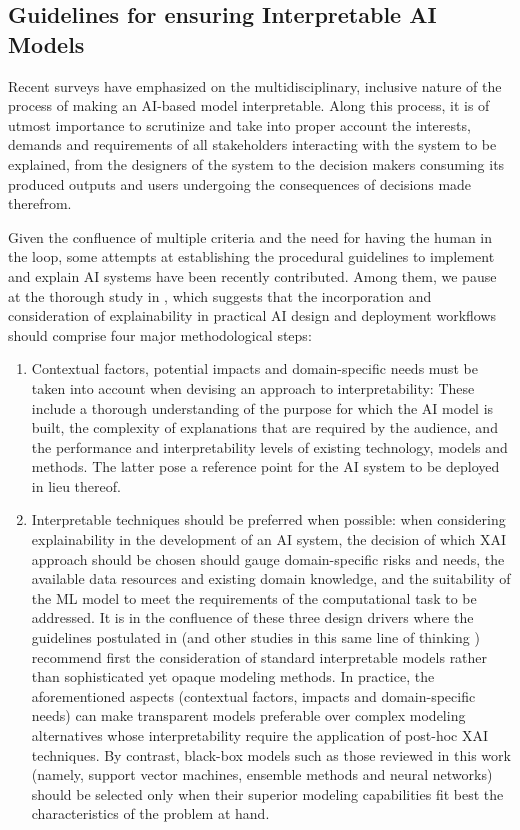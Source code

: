 \documentclass[final]{elsarticle}
\begin{document}
{\color{black}\subsection{Guidelines for ensuring Interpretable AI Models} \label{ssec:guidelines}

Recent surveys have emphasized on the multidisciplinary, inclusive nature of the process of making an AI-based model interpretable. Along this process, it is of utmost importance to scrutinize and take into proper account the interests, demands and requirements of all stakeholders interacting with the system to be explained, from the designers of the system to the decision makers consuming its produced outputs and users undergoing the consequences of decisions made therefrom.

Given the confluence of multiple criteria and the need for having the human in the loop, some attempts at establishing the procedural guidelines to implement and explain AI systems have been recently contributed. Among them, we pause at the thorough study in \cite{1906.05684}, which suggests that the incorporation and consideration of explainability in practical AI design and deployment workflows should comprise four major methodological steps:
\begin{enumerate}[leftmargin=*]
\item Contextual factors, potential impacts and domain-specific needs must be taken into account when devising an approach to interpretability: These include a thorough understanding of the purpose for which the AI model is built, the complexity of explanations that are required by the audience, and the performance and interpretability levels of existing technology, models and methods. The latter pose a reference point for the AI system to be deployed in lieu thereof.

\item Interpretable techniques should be preferred when possible: when considering explainability in the development of an AI system, the decision of which XAI approach should be chosen should gauge domain-specific risks and needs, the available data resources and existing domain knowledge, and the suitability of the ML model to meet the requirements of the computational task to be addressed. It is in the confluence of these three design drivers where the guidelines postulated in \cite{1906.05684} (and other studies in this same line of thinking \cite{1811.10154}) recommend first the consideration of standard interpretable models rather than sophisticated yet opaque modeling methods. In practice, the aforementioned aspects (contextual factors, impacts and domain-specific needs) can make transparent models preferable over complex modeling alternatives whose interpretability require the application of post-hoc XAI techniques. By contrast, black-box models such as those reviewed in this work (namely, support vector machines, ensemble methods and neural networks) should be selected only when their superior modeling capabilities fit best the characteristics of the problem at hand. 


\end{enumerate}}
\end{document}
